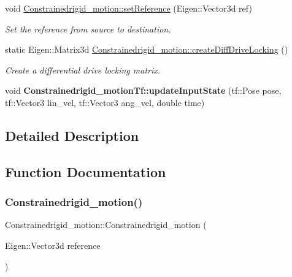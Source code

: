 \begin{DoxyCompactItemize}
void \hyperlink{group__RigidMotion_ga2cc2728f1d7865deea62a7fe540eee1a}{Constrainedrigid\+\_\+motion\+::set\+Reference} (Eigen\+::\+Vector3d ref)
\begin{DoxyCompactList}\small\item\em Set the reference from source to destination. \end{DoxyCompactList}\item 
static Eigen\+::\+Matrix3d \hyperlink{group__RigidMotion_ga8f1f65bf1494ab1ddc8fe3d2af5353a4}{Constrainedrigid\+\_\+motion\+::create\+Diff\+Drive\+Locking} ()
\begin{DoxyCompactList}\small\item\em Create a differential drive locking matrix. \end{DoxyCompactList}\item 
\mbox{\label{group__RigidMotion_ga5af2a56bafb5ce299234c63ac25257a0}} 
void {\bfseries Constrainedrigid\+\_\+motion\+Tf\+::update\+Input\+State} (tf\+::\+Pose pose, tf\+::\+Vector3 lin\+\_\+vel, tf\+::\+Vector3 ang\+\_\+vel, double time)
\end{DoxyCompactItemize}


\subsection{Detailed Description}


\subsection{Function Documentation}
\mbox{\label{group__RigidMotion_ga1db11e0353c9a9f08e78fb935b0cee96}} 
\subsubsection{\texorpdfstring{Constrainedrigid\+\_\+motion()}{Constrainedrigid\_motion()}}
{\footnotesize\ttfamily Constrainedrigid\+\_\+motion\+::\+Constrainedrigid\+\_\+motion (\begin{DoxyParamCaption}\item[{Eigen\+::\+Vector3d}]{reference }\end{DoxyParamCaption})}



